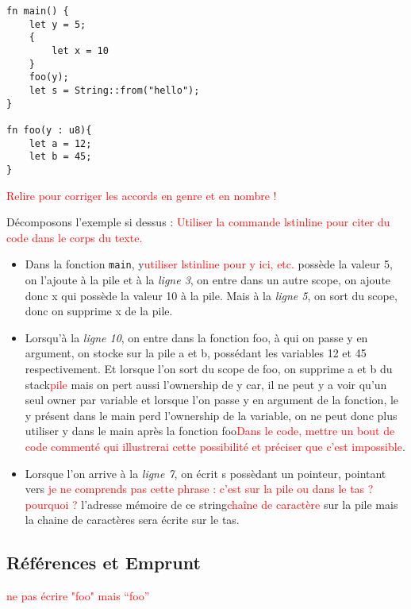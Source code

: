 \documentclass{article}
\newcommand{\TODO}[1]{\textcolor{red}{#1}}
\begin{document}
\begin{lstlisting}
fn main() {
    let y = 5;
    {
        let x = 10
    }
    foo(y);
    let s = String::from("hello");
}

fn foo(y : u8){
    let a = 12;
    let b = 45;
}
\end{lstlisting}

\TODO{Relire pour corriger les accords en genre et en nombre !}

Décomposons l'exemple si dessus :
\TODO{Utiliser la commande lstinline pour citer du code dans le corps du texte.}
\begin{itemize}
\item Dans la fonction \lstinline!main!, y\TODO{utiliser lstinline pour y ici, etc.} possède la valeur 5, on l'ajoute à la pile et à la \textit{ligne 3}, on entre dans un autre scope, on ajoute donc x qui possède la valeur 10 à la pile. Mais à la  \textit{ligne 5}, on sort du scope, donc on supprime x de la pile. 
\item Lorsqu'à la \textit{ligne 10}, on entre dans la fonction foo, à qui on passe y en argument, on stocke sur la pile a et b, possédant les variables 12 et 45 respectivement. Et lorsque l'on sort du scope de foo, on supprime a et b du stack\TODO{pile} mais on pert aussi l'ownership de y car, il ne peut y a voir qu'un seul owner par variable et lorsque l'on passe y en argument de la fonction, le y présent dans le main perd l'ownership de la variable, on ne peut donc plus utiliser y dans le main après la fonction foo\TODO{Dans le code, mettre un bout de code commenté qui illustrerai cette possibilité et préciser que c'est impossible}.
\item Lorsque l'on  arrive à la \textit{ligne 7}, on écrit s possèdant un pointeur, pointant vers \TODO{je ne comprends pas cette phrase : c'est sur la pile ou dans le tas ? pourquoi ?} l'adresse mémoire de ce string\TODO{chaîne de caractère} sur la pile mais la chaine de caractères sera écrite sur le tas. 
\end{itemize}

\subsection{Références et Emprunt}

\TODO{ne pas écrire "foo" mais ``foo''}
\end{document}
